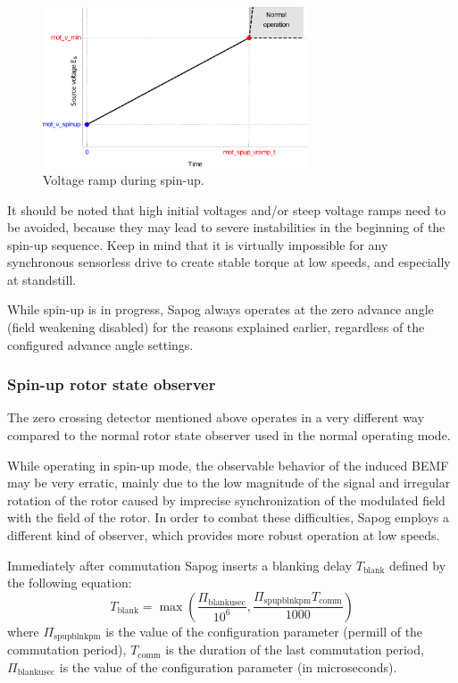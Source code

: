 \documentclass{zubaxdoc}
\begin{document}
\begin{figure}[hbt]
    \centering
	\includegraphics[width=0.7\textwidth]{spinup_voltage_ramp}
	\caption{Voltage ramp during spin-up.
	\label{spinup_voltage_ramp}}
\end{figure}

It should be noted that high initial voltages and/or steep voltage ramps need to be avoided,
because they may lead to severe instabilities in the beginning of the spin-up sequence.
Keep in mind that it is virtually impossible for any synchronous sensorless drive to create stable
torque at low speeds, and especially at standstill.

While spin-up is in progress, Sapog always operates at the zero advance angle
(field weakening disabled) for the reasons explained earlier,
regardless of the configured advance angle settings.

\subsubsection{Spin-up rotor state observer}

The zero crossing detector mentioned above operates in a very different way compared to the
normal rotor state observer used in the normal operating mode.

While operating in spin-up mode, the observable behavior of the induced BEMF may be very erratic,
mainly due to the low magnitude of the signal and irregular rotation of the rotor caused by
imprecise synchronization of the modulated field with the field of the rotor.
In order to combat these difficulties, Sapog employs a different kind of observer, which provides
more robust operation at low speeds.

Immediately after commutation Sapog inserts a blanking delay $T_\text{blank}$
defined by the following equation:
\begin{equation}
T_{\text{blank}}=
\max \left(\frac{\Pi_{\text{blankusec}}}{10^6},
\frac{\Pi_{\text{spupblnkpm}} T_{\text{comm}}}{1000}\right)
\end{equation}
where $\Pi_{\text{spupblnkpm}}$ is the value of the configuration parameter 
(permill of the commutation period),
$T_{\text{comm}}$ is the duration of the last commutation period,
$\Pi_{\text{blankusec}}$ is the value of the configuration parameter 
(in microseconds).
\end{document}
